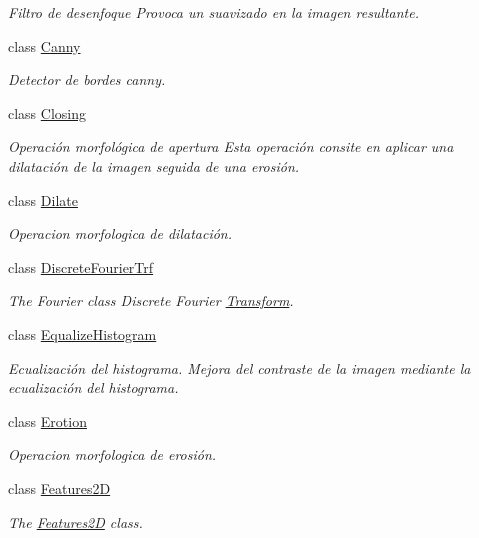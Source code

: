\begin{DoxyCompactItemize}
\begin{DoxyCompactList}\small\item\em Filtro de desenfoque Provoca un suavizado en la imagen resultante. \end{DoxyCompactList}\item 
class \hyperlink{class_i3_d_1_1_canny}{Canny}
\begin{DoxyCompactList}\small\item\em Detector de bordes canny. \end{DoxyCompactList}\item 
class \hyperlink{class_i3_d_1_1_closing}{Closing}
\begin{DoxyCompactList}\small\item\em Operación morfológica de apertura Esta operación consite en aplicar una dilatación de la imagen seguida de una erosión. \end{DoxyCompactList}\item 
class \hyperlink{class_i3_d_1_1_dilate}{Dilate}
\begin{DoxyCompactList}\small\item\em Operacion morfologica de dilatación. \end{DoxyCompactList}\item 
class \hyperlink{class_i3_d_1_1_discrete_fourier_trf}{Discrete\+Fourier\+Trf}
\begin{DoxyCompactList}\small\item\em The Fourier class Discrete Fourier \hyperlink{class_i3_d_1_1_transform}{Transform}. \end{DoxyCompactList}\item 
class \hyperlink{class_i3_d_1_1_equalize_histogram}{Equalize\+Histogram}
\begin{DoxyCompactList}\small\item\em Ecualización del histograma. Mejora del contraste de la imagen mediante la ecualización del histograma. \end{DoxyCompactList}\item 
class \hyperlink{class_i3_d_1_1_erotion}{Erotion}
\begin{DoxyCompactList}\small\item\em Operacion morfologica de erosión. \end{DoxyCompactList}\item 
class \hyperlink{class_i3_d_1_1_features2_d}{Features2D}
\begin{DoxyCompactList}\small\item\em The \hyperlink{class_i3_d_1_1_features2_d}{Features2D} class. \end{DoxyCompactList}\item 

\end{DoxyCompactItemize}
